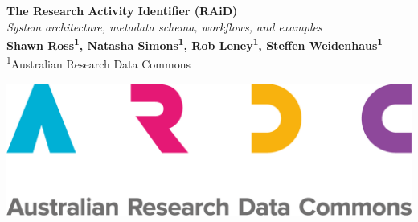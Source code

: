 \documentclass[a0,portrait]{a0poster}
\begin{document}
\setlength{\columnsep}{2cm}

\begin{multicols}{2}

\noindent
\vspace{0pt}
\Huge \color{ARDCBlue} \textbf{The Research Activity Identifier (RAiD)} \color{Black}\\[0.3cm]
\Large\textit{System architecture, metadata schema, workflows, and examples}\\[1cm]
\large \textbf{Shawn Ross\textsuperscript{1}, Natasha Simons\textsuperscript{1}, Rob Leney\textsuperscript{1}, Steffen Weidenhaus\textsuperscript{1}}\\[0.5cm]
\large \textsuperscript{1}Australian Research Data Commons

\vfill\null
\columnbreak
\raggedleft
\noindent\includegraphics[width=0.5\linewidth]{ARDC logo - RGB.png}

\end{multicols}     
\end{document}
